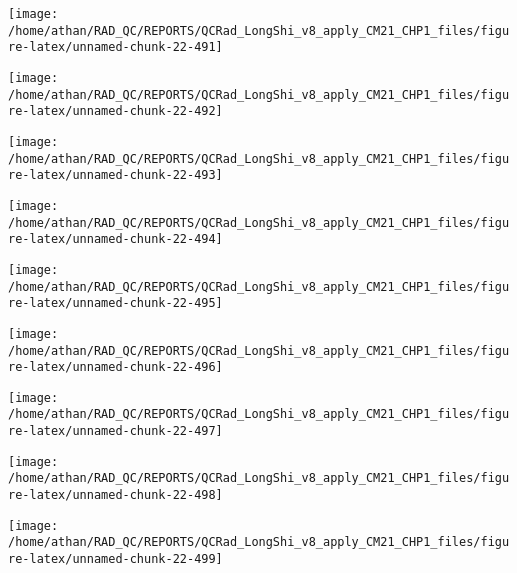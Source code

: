 \documentclass[
  10pt,
  a4paper,oneside]{article}
\begin{document}
\begin{center}\texttt{[image: /home/athan/RAD\_QC/REPORTS/QCRad\_LongShi\_v8\_apply\_CM21\_CHP1\_files/figure-latex/unnamed-chunk-22-491]} \end{center}

\begin{center}\texttt{[image: /home/athan/RAD\_QC/REPORTS/QCRad\_LongShi\_v8\_apply\_CM21\_CHP1\_files/figure-latex/unnamed-chunk-22-492]} \end{center}

\begin{center}\texttt{[image: /home/athan/RAD\_QC/REPORTS/QCRad\_LongShi\_v8\_apply\_CM21\_CHP1\_files/figure-latex/unnamed-chunk-22-493]} \end{center}

\begin{center}\texttt{[image: /home/athan/RAD\_QC/REPORTS/QCRad\_LongShi\_v8\_apply\_CM21\_CHP1\_files/figure-latex/unnamed-chunk-22-494]} \end{center}

\begin{center}\texttt{[image: /home/athan/RAD\_QC/REPORTS/QCRad\_LongShi\_v8\_apply\_CM21\_CHP1\_files/figure-latex/unnamed-chunk-22-495]} \end{center}

\begin{center}\texttt{[image: /home/athan/RAD\_QC/REPORTS/QCRad\_LongShi\_v8\_apply\_CM21\_CHP1\_files/figure-latex/unnamed-chunk-22-496]} \end{center}

\begin{center}\texttt{[image: /home/athan/RAD\_QC/REPORTS/QCRad\_LongShi\_v8\_apply\_CM21\_CHP1\_files/figure-latex/unnamed-chunk-22-497]} \end{center}

\begin{center}\texttt{[image: /home/athan/RAD\_QC/REPORTS/QCRad\_LongShi\_v8\_apply\_CM21\_CHP1\_files/figure-latex/unnamed-chunk-22-498]} \end{center}

\begin{center}\texttt{[image: /home/athan/RAD\_QC/REPORTS/QCRad\_LongShi\_v8\_apply\_CM21\_CHP1\_files/figure-latex/unnamed-chunk-22-499]} \end{center}
\end{document}
